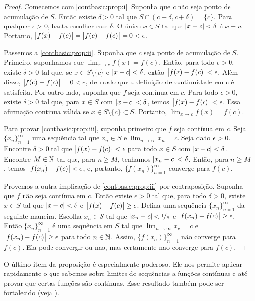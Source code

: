 \begin{proof}
\pagebreak[2]
Comecemos com \ref{contbasic:prop:i}. Suponha que $c$ não seja ponto de acumulação de
$S$. Então existe $\delta > 0$
tal que $S \cap (c-\delta,c+\delta) = \{ c \}$.
Para qualquer $\epsilon > 0$, basta escolher esse $\delta$.
O único $x \in S$ tal que $\lvert {x-c} \rvert < \delta$ é $x=c$. Portanto,
$\bigl\lvert {f(x)-f(c)} \bigr\rvert = \bigl\lvert {f(c)-f(c)} \bigr\rvert = 0 < \epsilon$.

Passemos a \ref{contbasic:prop:ii}.
Suponha que $c$ seja ponto de acumulação de $S$. Primeiro, suponhamos
que $\lim_{x\to c} f(x) = f(c)$. Então, para todo $\epsilon > 0$,
existe $\delta > 0$ tal que, se $x \in S \setminus \{ c \}$
e $\lvert {x-c} \rvert < \delta$, então $\bigl\lvert {f(x)-f(c)} \bigr\rvert < \epsilon$.
Além disso, $\bigl\lvert {f(c)-f(c)} \bigr\rvert = 0 < \epsilon$, de modo que a definição de continuidade em
$c$ é satisfeita. Por outro lado, suponha que $f$ seja contínua
em $c$. Para todo $\epsilon > 0$, existe $\delta > 0$
tal que, para $x \in S$ com $\lvert {x-c} \rvert < \delta$, temos
$\bigl\lvert {f(x)-f(c)} \bigr\rvert < \epsilon$. Essa afirmação continua válida se
$x \in S \setminus \{ c \} \subset S$. Portanto, $\lim_{x\to c} f(x) =
f(c)$.

Para provar \ref{contbasic:prop:iii}, suponha primeiro que $f$ seja contínua em $c$.
Seja $\{ x_n \}_{n=1}^\infty$
uma sequência tal que $x_n \in S$ e $\lim_{n\to\infty} x_n = c$. Seja dado $\epsilon > 0$.
Encontre $\delta > 0$ tal que $\bigl\lvert {f(x)-f(c)} \bigr\rvert < \epsilon$
para todo $x \in S$ com $\lvert {x-c} \rvert < \delta$. Encontre $M \in {\mathbb{N}}$
tal que, para $n \geq M$, tenhamos $\lvert {x_n-c} \rvert < \delta$. Então, para
$n \geq M$, temos $\bigl\lvert {f(x_n)-f(c)} \bigr\rvert < \epsilon$,
e, portanto, $\bigl\{ f(x_n) \bigr\}_{n=1}^\infty$
converge para $f(c)$.

Provemos a outra implicação de \ref{contbasic:prop:iii} por contraposição.
Suponha que $f$ não seja contínua em $c$. Então existe $\epsilon > 0$
tal que, para todo $\delta > 0$, existe $x \in S$
tal que $\lvert {x-c} \rvert < \delta$ e $\bigl\lvert {f(x)-f(c)} \bigr\rvert \geq \epsilon$.
Defina uma sequência $\{ x_n \}_{n=1}^\infty$ da seguinte maneira.
Escolha $x_n \in S$ tal que $\lvert {x_n-c} \rvert < \nicefrac{1}{n}$
e $\bigl\lvert {f(x_n)-f(c)} \bigr\rvert \geq \epsilon$.
Então $\{ x_n \}_{n=1}^\infty$ é uma sequência em $S$ tal que
$\lim_{n\to\infty} x_n = c$ e $\bigl\lvert {f(x_n)-f(c)} \bigr\rvert \geq \epsilon$ para todo $n \in {\mathbb{N}}$.
Assim, $\bigl\{ f(x_n) \bigr\}_{n=1}^\infty$
não converge para $f(c)$. Ela pode convergir ou não, mas certamente
não converge para $f(c)$.
\end{proof}

O último item da proposição é especialmente poderoso. Ele nos permite
aplicar rapidamente o que sabemos sobre limites de sequências a funções contínuas
e até provar que certas funções são contínuas.
Esse resultado também pode ser fortalecido (veja ).


